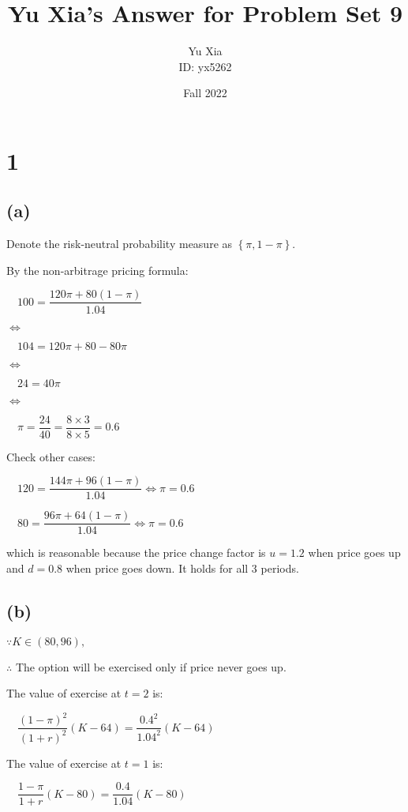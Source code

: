 \documentclass{article}
\author{Yu Xia \\ ID: yx5262}
\title{Yu Xia's Answer for Problem Set 9}
\date{Fall 2022}
\begin{document}
\maketitle

\nocite{*}

\section*{1}

\subsection*{(a)}

Denote the risk-neutral probability measure as $\left\{\pi, 1-\pi\right\}$.

By the non-arbitrage pricing formula:

$\quad 100=\dfrac{120\pi+80\left(1-\pi\right)}{1.04}$

$\iff$

$\quad 104=120\pi+80-80\pi$

$\iff$

$\quad 24=40\pi$

$\iff$

$\quad \pi=\dfrac{24}{40}=\dfrac{8\times3}{8\times5}=0.6$

Check other cases:

$\quad 120=\dfrac{144\pi+96\left(1-\pi\right)}{1.04} \iff \pi=0.6$

$\quad 80=\dfrac{96\pi+64\left(1-\pi\right)}{1.04} \iff \pi=0.6$

which is reasonable because the price change factor is $u=1.2$ when price goes up and $d=0.8$ when price goes down. It holds for all 3 periods.

\subsection*{(b)}

$\because K\in \left(80, 96\right),$

$\therefore$ The option will be exercised only if price never goes up. 

The value of exercise at $t=2$ is:

$\quad\dfrac{\left(1-\pi\right)^{2}}{\left(1+r\right)^{2}}\left(K-64\right)=\dfrac{0.4^{2}}{1.04^{2}}\left(K-64\right)$

The value of exercise at $t=1$ is:

$\quad\dfrac{1-\pi}{1+r}\left(K-80\right)=\dfrac{0.4}{1.04}\left(K-80\right)$
\end{document}
